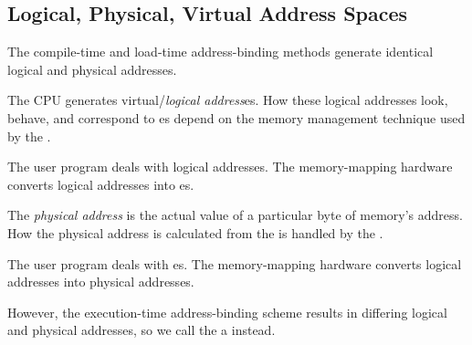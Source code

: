 \subsection{Logical, Physical, Virtual Address Spaces}\label{subsec:Logical_Physical_Virtual_Address_Space}
The compile-time and load-time address-binding methods generate identical logical and physical addresses.

\begin{definition}\label{def:Logical_Address}
  The CPU generates virtual/\emph{logical address}es.
  How these logical addresses look, behave, and correspond to es depend on the memory management technique used by the .

  The user program deals with logical addresses.
  The memory-mapping hardware converts logical addresses into es.
\end{definition}

\begin{definition}\label{def:Physical_Address}
  The \emph{physical address} is the actual value of a particular byte of memory's address.
  How the physical address is calculated from the  is handled by the .

  The user program deals with es.
  The memory-mapping hardware converts logical addresses into physical addresses.
\end{definition}

However, the execution-time address-binding scheme results in differing logical and physical addresses, so we call the  a  instead.


